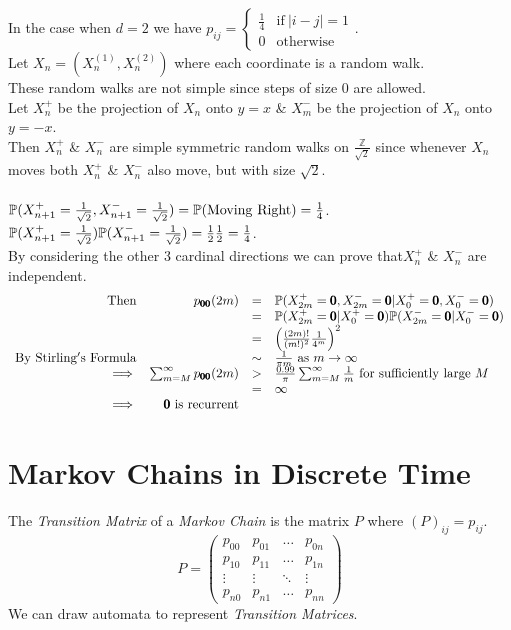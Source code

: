 \documentclass[11pt,a4paper]{article}
\begin{document}
In the case when $d=2$ we have $p_{ij}=\begin{cases}\frac{1}{4}&\mathrm{if\ }|i-j|=1\\0&\mathrm{otherwise}\end{cases}$.\\
Let $X_n=(X_n^{(1)},X_n^{(2)})$ where each coordinate is a random walk.\\
These random walks are not simple since steps of size $0$ are allowed.\\
Let $X_n^+$ be the projection of $X_n$ onto $y=x$ \& $X_m^-$ be the projection of $X_n$ onto $y=-x$.\\
Then $X_n^+$ \& $X_n^-$ are simple symmetric random walks on $\frac{\mathbb{Z}}{\sqrt{2}}$ since whenever $X_n$ moves both $X_n^+$ \& $X_n^-$ also move, but with size $\sqrt{2}$.\\
\\
$\prob(X_{n+1}^+=\frac{1}{\sqrt{2}},X_{n+1}^-=\frac{1}{\sqrt{2}})=\prob(\mathrm{Moving\ Right})=\frac{1}{4}$.\\
$\mathbb{P}(X_{n+1}^+=\frac{1}{\sqrt{2}})\mathbb{P}(X_{n+1}^-=\frac{1}{\sqrt{2}})=\frac{1}{2}\frac{1}{2}=\frac{1}{4}$.\\
By considering the other 3 cardinal directions we can prove that$X_n^+$ \& $X_n^-$ are independent.\\
\[\begin{array}{rrcl}
\mathrm{Then}&p_{\pmb{0}\pmb{0}}(2m)&=&\prob(X_{2m}^+=\pmb{0},X_{2m}^-=\pmb{0}|X_0^+=\pmb{0},X_0^-=\pmb{0})\\
&&=&\prob(X_{2m}^+=\pmb{0}|X_0^+=\pmb{0})\prob(X_{2m}^-=\pmb{0}|X_0^-=\pmb{0})\\
&&=&\left(\frac{(2m)!}{(m!)^2}\frac{1}{4^m}\right)^2\\
\mathrm{By\ Stirling's\ Formula}&&\sim&\frac{1}{\pi m}\ \mathrm{as\ }m\to\infty\\
\implies&\sum_{m=M}^\infty p_{\pmb{0}\pmb{0}}(2m)&>&\frac{0.99}{\pi}\sum_{m=M}^\infty\frac{1}{m}\mathrm{\ for\ sufficiently\ large\ }M\\
&&=&\infty\\
\implies&\pmb{0} \mathrm{\ is\ recurrent}
\end{array}\]

\section{Markov Chains in Discrete Time}

The \textit{Transition Matrix} of a \textit{Markov Chain} is the matrix $P$ where $(P)_{ij}=p_{ij}$.
$$P=\begin{pmatrix}p_{00}&p_{01}&\dots&p_{0n}\\p_{10}&p_{11}&\dots&p_{1n}\\\vdots&\vdots&\ddots&\vdots\\p_{n0}&p_{n1}&\dots&p_{nn}\end{pmatrix}$$
\nb We can draw automata to represent \textit{Transition Matrices}.\\
\end{document}
